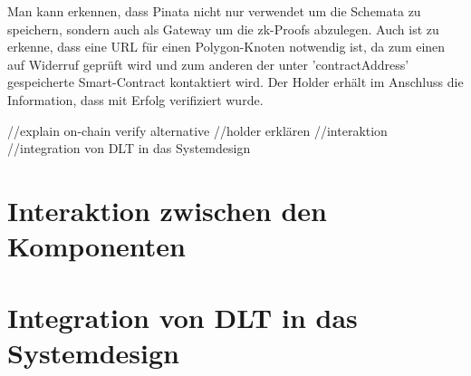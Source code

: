 Man kann erkennen, dass Pinata nicht nur verwendet um die Schemata zu speichern, sondern auch als Gateway um die zk-Proofs abzulegen. Auch ist zu erkenne, dass eine URL für einen Polygon-Knoten notwendig ist, da zum einen auf Widerruf geprüft wird und zum anderen der unter 'contractAddress' gespeicherte Smart-Contract kontaktiert wird. Der Holder erhält im Anschluss die Information, dass mit Erfolg verifiziert wurde.

//explain on-chain verify alternative
//holder erklären
//interaktion
//integration von DLT in das Systemdesign
\section{Interaktion zwischen den Komponenten}
\blindtext

\section{Integration von DLT in das Systemdesign}
\blindtext
